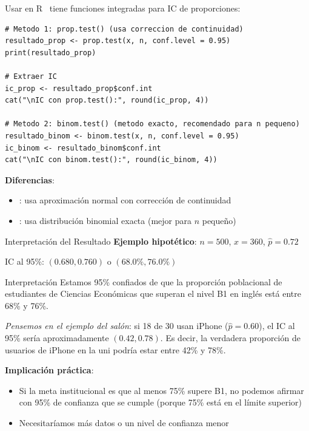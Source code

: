 \documentclass[aspectratio=169, 11pt]{beamer}
\begin{document}
\begin{frame}[fragile]{Usar  en R}
\R\ tiene funciones integradas para IC de proporciones:

\begin{lstlisting}
# Metodo 1: prop.test() (usa correccion de continuidad)
resultado_prop <- prop.test(x, n, conf.level = 0.95)
print(resultado_prop)

# Extraer IC
ic_prop <- resultado_prop$conf.int
cat("\nIC con prop.test():", round(ic_prop, 4))

# Metodo 2: binom.test() (metodo exacto, recomendado para n pequeno)
resultado_binom <- binom.test(x, n, conf.level = 0.95)
ic_binom <- resultado_binom$conf.int
cat("\nIC con binom.test():", round(ic_binom, 4))
\end{lstlisting}

\vspace{0.3cm}
\textbf{Diferencias}:
\begin{itemize}
  \item {}: usa aproximación normal con corrección de continuidad
  \item {}: usa distribución binomial exacta (mejor para $n$ pequeño)
\end{itemize}
\end{frame}

\begin{frame}{Interpretación del Resultado}
\textbf{Ejemplo hipotético}: $n = 500$, $x = 360$, $\hat{p} = 0.72$

\vspace{0.3cm}
IC al 95\%: $(0.680, 0.760)$ o $(68.0\%, 76.0\%)$

\vspace{0.3cm}
\begin{exampleblock}{Interpretación}
Estamos 95\% confiados de que la proporción poblacional de estudiantes de Ciencias Econ\'omicas que superan el nivel B1 en inglés está entre 68\% y 76\%.

\smallskip
\textit{Pensemos en el ejemplo del sal\'on}: si 18 de 30 usan iPhone ($\hat{p} = 0.60$), el IC al 95\% ser\'ia aproximadamente $(0.42, 0.78)$. Es decir, la verdadera proporci\'on de usuarios de iPhone en la uni podr\'ia estar entre 42\% y 78\%.
\end{exampleblock}

\textbf{Implicación práctica}:
\begin{itemize}
  \item Si la meta institucional es que al menos 75\% supere B1, no podemos afirmar con 95\% de confianza que se cumple (porque 75\% está en el límite superior)
  \item Necesitaríamos más datos o un nivel de confianza menor
\end{itemize}
\end{frame}
\end{document}
